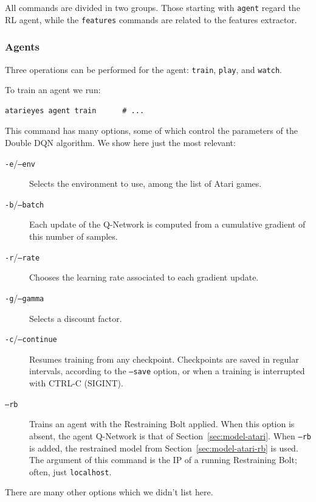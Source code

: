 All commands are divided in two groups. Those starting with \texttt{agent}
regard the RL agent, while the \texttt{features} commands are related to the
features extractor.


\subsubsection*{Agents}

Three operations can be performed for the agent: \texttt{train},
\texttt{play}, and \texttt{watch}.

To train an agent we run:
\begin{verbatim}
atarieyes agent train      # ...
\end{verbatim}
This command has many options, some of which control the parameters of the
Double DQN algorithm. We show here just the most relevant:
\begin{description}
	\item [\texttt{-e}/\texttt{--env}] Selects the environment to use, among the
		list of Atari games.
	\item [\texttt{-b}/\texttt{--batch}] Each update of the Q-Network is
		computed from a cumulative gradient of this number of samples.
	\item [\texttt{-r}/\texttt{--rate}] Chooses the learning rate associated
		to each gradient update.
	\item [\texttt{-g}/\texttt{--gamma}] Selects a discount factor.
	\item [\texttt{-c}/\texttt{--continue}] Resumes training from any
		checkpoint. Checkpoints are saved in regular intervals, according to the
		\texttt{--save} option, or when a training is interrupted with CTRL-C
		(SIGINT).
	\item [\texttt{--rb}] Trains an agent with the Restraining Bolt applied.
		When this option is absent, the agent Q-Network is that of
		Section~\ref{sec:model-atari}. When \texttt{--rb} is added, the
		restrained model from Section~\ref{sec:model-atari-rb} is used.
		The argument of this command is the IP of a running Restraining Bolt;
		often, just \texttt{localhost}.
\end{description}
There are many other options which we didn't list here.

